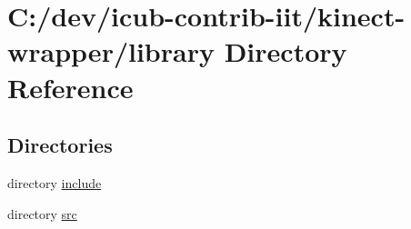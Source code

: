 \section{C\+:/dev/icub-\/contrib-\/iit/kinect-\/wrapper/library Directory Reference}
\label{dir_e3d620c6b6fdb93ed3bc6186215bde2e}
\subsection*{Directories}
\begin{DoxyCompactItemize}
\item 
directory \hyperlink{dir_9bb0cdb2fc6936e925cffa69d90b0c80}{include}
\item 
directory \hyperlink{dir_255fa8f554e95a439f260058328638ab}{src}
\end{DoxyCompactItemize}

